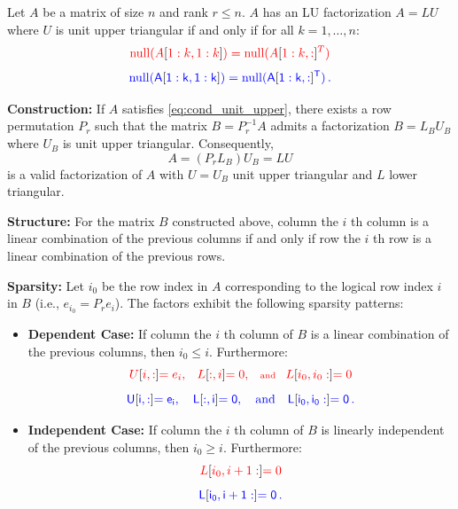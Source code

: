 \documentclass[10pt,twoside]{siamart1116}
\DeclareMathOperator{\nl}{null}
\numberwithin{theorem}{section}
\providecommand{\DIFadd}[1]{{\protect\color{blue} \sf #1}} %
\providecommand{\DIFdel}[1]{{\protect\color{red} \scriptsize #1}} %
\providecommand{\DIFaddbegin}{} %
\providecommand{\DIFaddend}{} %
\providecommand{\DIFdelbegin}{} %
\providecommand{\DIFdelend}{} %
\begin{document}
\begin{corollary}\label{corr:main_unit_upper}
  Let $A$ be a matrix of size $n$ and rank $r \le n$. $A$ has an LU factorization $A = LU$ where $U$ is unit upper triangular if and only if for all $k = 1, \ldots, n$:
  \DIFdelbegin \begin{displaymath}
		\DIFdel{\label{eq:cond_unit_upper}
		\nl(A}[\DIFdel{1:k,1:k}]\DIFdel{) = \nl(}{\DIFdel{A}[\DIFdel{1:k,:}]}\DIFdel{^T)
	}\end{displaymath}%
\DIFdelend \DIFaddbegin \begin{equation}
    \DIFadd{\label{eq:cond_unit_upper}
    \nl(A}[\DIFadd{1:k,1:k}]\DIFadd{) = \nl(}{\DIFadd{A}[\DIFadd{1:k,:}]}\DIFadd{^T) \,.
  }\end{equation}\DIFaddend 

  \noindent\textbf{Construction:} If $A$ satisfies \DIFdelbegin %
\DIFdelend \DIFaddbegin \cref{eq:cond_unit_upper}\DIFaddend , there exists a row permutation $P_r$ such that the matrix $B = P_r^{-1} A$ admits a factorization $B = L_B U_B$ where $U_B$ is unit upper triangular. Consequently,
  \[ A = (P_r L_B) U_B = L U \]
  is a valid factorization of $A$ with $U=U_B$ unit upper triangular and $L$ lower triangular.

  \noindent\textbf{Structure:} For the matrix $B$ constructed above, \DIFdelbegin \DIFdel{column }\DIFdelend \DIFaddbegin \DIFadd{the }\DIFaddend $i$\DIFaddbegin \DIFadd{th column }\DIFaddend is a linear combination of the previous columns if and only if \DIFdelbegin \DIFdel{row }\DIFdelend \DIFaddbegin \DIFadd{the }\DIFaddend $i$\DIFaddbegin \DIFadd{th row }\DIFaddend is a linear combination of the previous rows.

  \noindent\textbf{Sparsity:} Let $i_0$ be the row index in $A$ corresponding to the logical row index $i$ in $B$ (i.e., $e_{i_0} = P_r e_i$). The factors exhibit the following sparsity patterns:
  \begin{itemize}
    \item \textbf{Dependent Case:} If \DIFdelbegin \DIFdel{column }\DIFdelend \DIFaddbegin \DIFadd{the }\DIFaddend $i$\DIFaddbegin \DIFadd{th column }\DIFaddend of $B$ is a linear combination of the previous columns, then $i_0 \le i$. Furthermore:
      \DIFdelbegin \[ \DIFdel{U}[\DIFdel{i,:}] \DIFdel{= e_i, \quad L}[\DIFdel{:,i}] \DIFdel{= 0, \quad \text{and} \quad L}[\DIFdel{i_0, i_0:}] \DIFdel{= 0 }\]%
\DIFdelend \DIFaddbegin \[ \DIFadd{U}[\DIFadd{i,:}] \DIFadd{= e_i, \quad L}[\DIFadd{:,i}] \DIFadd{= 0, \quad \text{and} \quad L}[\DIFadd{i_0, i_0:}] \DIFadd{= 0 \,. }\]\DIFaddend 
    \item \textbf{Independent Case:} If \DIFdelbegin \DIFdel{column }\DIFdelend \DIFaddbegin \DIFadd{the }\DIFaddend $i$\DIFaddbegin \DIFadd{th column }\DIFaddend of $B$ is linearly independent of the previous columns, then $i_0 \ge i$. Furthermore:
      \DIFdelbegin \[ \DIFdel{L}[\DIFdel{i_0, i+1:}] \DIFdel{= 0 }\]%
\DIFdelend \DIFaddbegin \[ \DIFadd{L}[\DIFadd{i_0, i+1:}] \DIFadd{= 0 \,. }\]\DIFaddend 
  \end{itemize}
\end{corollary}
\end{document}
